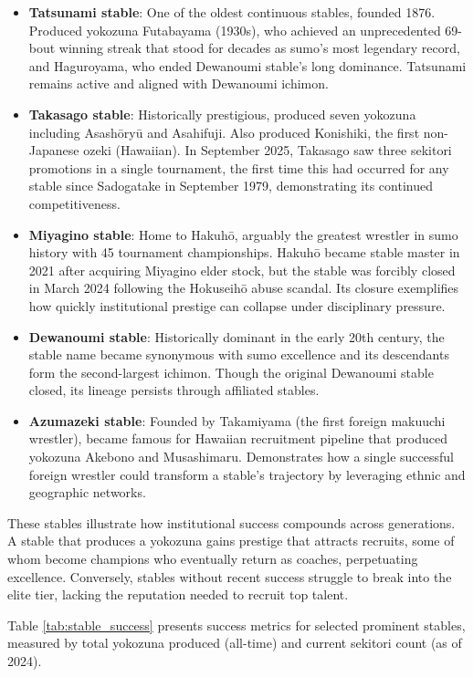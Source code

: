 \begin{itemize}
\item \textbf{Tatsunami stable}: One of the oldest continuous stables, founded 1876. Produced yokozuna Futabayama (1930s), who achieved an unprecedented 69-bout winning streak that stood for decades as sumo's most legendary record, and Haguroyama, who ended Dewanoumi stable's long dominance. Tatsunami remains active and aligned with Dewanoumi ichimon.
\item \textbf{Takasago stable}: Historically prestigious, produced seven yokozuna including Asashōryū and Asahifuji. Also produced Konishiki, the first non-Japanese ozeki (Hawaiian). In September 2025, Takasago saw three sekitori promotions in a single tournament, the first time this had occurred for any stable since Sadogatake in September 1979, demonstrating its continued competitiveness.
\item \textbf{Miyagino stable}: Home to Hakuhō, arguably the greatest wrestler in sumo history with 45 tournament championships. Hakuhō became stable master in 2021 after acquiring Miyagino elder stock, but the stable was forcibly closed in March 2024 following the Hokuseihō abuse scandal. Its closure exemplifies how quickly institutional prestige can collapse under disciplinary pressure.
\item \textbf{Dewanoumi stable}: Historically dominant in the early 20th century, the stable name became synonymous with sumo excellence and its descendants form the second-largest ichimon. Though the original Dewanoumi stable closed, its lineage persists through affiliated stables.
\item \textbf{Azumazeki stable}: Founded by Takamiyama (the first foreign makuuchi wrestler), became famous for Hawaiian recruitment pipeline that produced yokozuna Akebono and Musashimaru. Demonstrates how a single successful foreign wrestler could transform a stable's trajectory by leveraging ethnic and geographic networks.
\end{itemize}

These stables illustrate how institutional success compounds across generations. A stable that produces a yokozuna gains prestige that attracts recruits, some of whom become champions who eventually return as coaches, perpetuating excellence. Conversely, stables without recent success struggle to break into the elite tier, lacking the reputation needed to recruit top talent.

Table \ref{tab:stable_success} presents success metrics for selected prominent stables, measured by total yokozuna produced (all-time) and current sekitori count (as of 2024).

